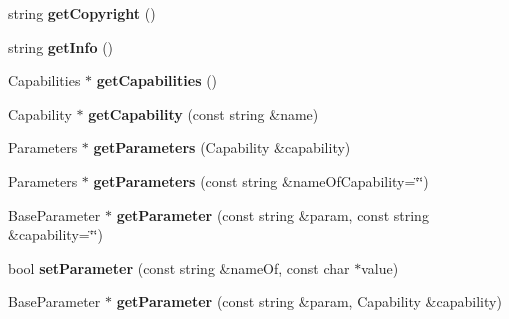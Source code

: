 \begin{DoxyCompactItemize}
\item 
\hypertarget{classrr_1_1_plugin_aaf17a03f4f4e5513c8f38e02566df54d}{string {\bfseries get\-Copyright} ()}\label{classrr_1_1_plugin_aaf17a03f4f4e5513c8f38e02566df54d}

\item 
\hypertarget{classrr_1_1_plugin_a915f41ce35b626351c521d7e3f20bb01}{string {\bfseries get\-Info} ()}\label{classrr_1_1_plugin_a915f41ce35b626351c521d7e3f20bb01}

\item 
\hypertarget{classrr_1_1_plugin_ace0aa875e4b57a10bc88a9e3b0cbd40c}{Capabilities $\ast$ {\bfseries get\-Capabilities} ()}\label{classrr_1_1_plugin_ace0aa875e4b57a10bc88a9e3b0cbd40c}

\item 
\hypertarget{classrr_1_1_plugin_a2f6286f0b7bbe63e17a57d574c5d9e8a}{Capability $\ast$ {\bfseries get\-Capability} (const string \&name)}\label{classrr_1_1_plugin_a2f6286f0b7bbe63e17a57d574c5d9e8a}

\item 
\hypertarget{classrr_1_1_plugin_adb6f95c31c251eb5aff9845b9938a605}{Parameters $\ast$ {\bfseries get\-Parameters} (Capability \&capability)}\label{classrr_1_1_plugin_adb6f95c31c251eb5aff9845b9938a605}

\item 
\hypertarget{classrr_1_1_plugin_af9ca9c07658925fa96c57d46d4c1b9f7}{Parameters $\ast$ {\bfseries get\-Parameters} (const string \&name\-Of\-Capability=\char`\"{}\char`\"{})}\label{classrr_1_1_plugin_af9ca9c07658925fa96c57d46d4c1b9f7}

\item 
\hypertarget{classrr_1_1_plugin_a14c1b97e8f21a6852d5893479112dcd8}{Base\-Parameter $\ast$ {\bfseries get\-Parameter} (const string \&param, const string \&capability=\char`\"{}\char`\"{})}\label{classrr_1_1_plugin_a14c1b97e8f21a6852d5893479112dcd8}

\item 
\hypertarget{classrr_1_1_plugin_a8c432021a744c9ccc52c8d03e9555125}{bool {\bfseries set\-Parameter} (const string \&name\-Of, const char $\ast$value)}\label{classrr_1_1_plugin_a8c432021a744c9ccc52c8d03e9555125}

\item 
\hypertarget{classrr_1_1_plugin_a9f4d84266f6caea8858d2f2b2f33a700}{Base\-Parameter $\ast$ {\bfseries get\-Parameter} (const string \&param, Capability \&capability)}\label{classrr_1_1_plugin_a9f4d84266f6caea8858d2f2b2f33a700}


\end{DoxyCompactItemize}
